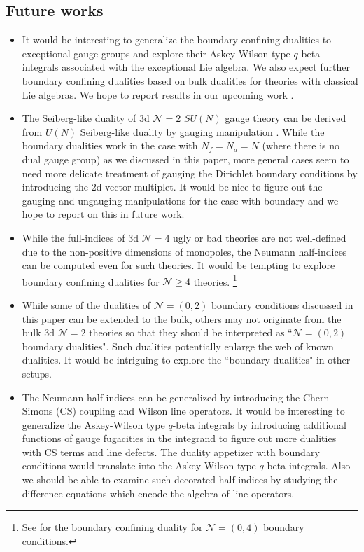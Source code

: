 \documentclass[12pt]{article}
\numberwithin{equation}{section}
\begin{document}
\subsection{Future works}
\label{sec_future}
\begin{itemize}

    \item It would be interesting to generalize the boundary confining dualities to exceptional gauge groups and explore their Askey-Wilson type $q$-beta integrals associated with the exceptional Lie algebra. We also expect further boundary confining dualities based on bulk dualities for theories with classical Lie algebras. We hope to report results in our upcoming work \cite{except:2023}.
    
        \item The Seiberg-like duality of 3d $\mathcal{N}=2$ $SU(N)$ gauge theory can be derived from $U(N)$ Seiberg-like duality by gauging manipulation \cite{Aharony:2013dha,Park:2013wta}. While the boundary dualities work in the case with $N_f=N_a=N$ (where there is no dual gauge group) as we discussed in this paper, more general cases seem to need more delicate treatment of gauging the Dirichlet boundary conditions by introducing the 2d vector multiplet. It would be nice to figure out the gauging and ungauging manipulations for the case with boundary and we hope to report on this in future work. 

    \item While the full-indices of 3d $\mathcal{N}=4$ ugly or bad theories \cite{Gaiotto:2008ak} are not well-defined due to the non-positive dimensions of monopoles, the Neumann half-indices can be computed even for such theories. It would be tempting to explore boundary confining dualities for $\mathcal{N}\ge 4$ theories. \footnote{See \cite{Okazaki:2019bok} for the boundary confining duality for $\mathcal{N}=(0,4)$ boundary conditions.}
    
    \item While some of the dualities of $\mathcal{N}=(0,2)$ boundary conditions discussed in this paper can be extended to the bulk, others may not originate from the bulk 3d $\mathcal{N}=2$ theories so that they should be interpreted as ``$\mathcal{N}=(0,2)$ boundary dualities". Such dualities potentially enlarge the web of known dualities. It would be intriguing to explore the ``boundary dualities" in other setups. 
    
    \item The Neumann half-indices can be generalized by introducing the Chern-Simons (CS) coupling and Wilson line operators. It would be interesting to generalize the Askey-Wilson type $q$-beta integrals by introducing additional functions of gauge fugacities in the integrand to figure out more dualities with CS terms and line defects. The duality appetizer  \cite{Jafferis:2011ns,Kapustin:2011vz,Benvenuti:2021nwt} with boundary conditions would translate into the Askey-Wilson type $q$-beta integrals. Also we should be able to examine such decorated half-indices by studying the difference equations which encode the algebra of line  operators. 
        

\end{itemize}
\end{document}
